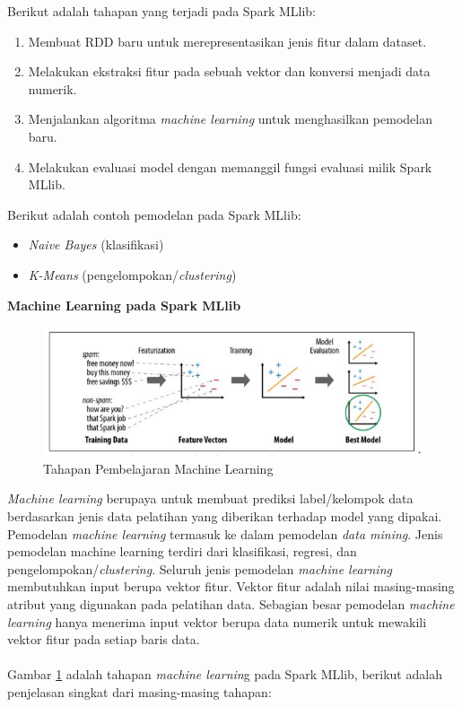 \documentclass[a4paper,twoside]{article}
\begin{document}
\begin{enumerate}
\newpage
Berikut adalah tahapan yang terjadi pada Spark MLlib:

\begin{enumerate}
\item Membuat RDD baru untuk merepresentasikan jenis fitur dalam dataset.
\item Melakukan ekstraksi fitur pada sebuah vektor dan konversi menjadi data numerik.
\item Menjalankan algoritma \textit{machine learning} untuk menghasilkan pemodelan baru.
\item Melakukan evaluasi model dengan memanggil fungsi evaluasi milik Spark MLlib.
\end{enumerate}

\noindent Berikut adalah contoh pemodelan pada Spark MLlib:

\begin{itemize}
\item \textit{Naive Bayes} (klasifikasi)
\item \textit{K-Means} (pengelompokan/\textit{clustering})
\end{itemize}

\textbf{Machine Learning pada Spark MLlib}

\begin{figure}[H]
	\centering
	\includegraphics[scale=0.75]{machinelearningmllib}
	\caption{Tahapan Pembelajaran Machine Learning}
	\label{fig:machinelearningmllib}
\end{figure}
\textit{Machine learning} berupaya untuk membuat prediksi label/kelompok data berdasarkan jenis data pelatihan yang diberikan terhadap model yang dipakai. Pemodelan \textit{machine learning} termasuk ke dalam pemodelan \textit{data mining}. Jenis pemodelan machine learning terdiri dari klasifikasi, regresi, dan pengelompokan/\textit{clustering}. Seluruh jenis pemodelan \textit{machine learning} membutuhkan input berupa vektor fitur. Vektor fitur adalah nilai masing-masing atribut yang digunakan pada pelatihan data. Sebagian besar pemodelan \textit{machine learning} hanya menerima input vektor berupa data numerik untuk mewakili vektor fitur pada setiap baris data.
\\\\
\noindent Gambar \ref{fig:machinelearningmllib} adalah tahapan \textit{machine learnin}g pada Spark MLlib, berikut adalah penjelasan singkat dari masing-masing tahapan:


\end{enumerate}
\end{document}

